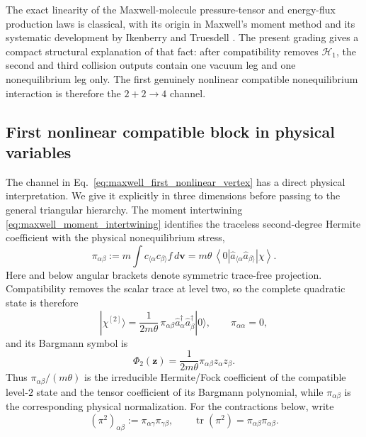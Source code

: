 \documentclass[11pt,oneside]{article}
\numberwithin{equation}{section}
\theoremstyle{definition}
\begin{document}
The exact linearity of the Maxwell-molecule pressure-tensor and energy-flux production laws is classical, with its origin in Maxwell's moment method and its systematic development by Ikenberry and Truesdell \cite{Maxwell1867DynamicalTheory,IkenberryTruesdell1956I,Truesdell1956II,TruesdellMuncaster1980Maxwell}.  The present grading gives a compact structural explanation of that fact: after compatibility removes $\mathscr H_1$, the second and third collision outputs contain one vacuum leg and one nonequilibrium leg only.  The first genuinely nonlinear compatible nonequilibrium interaction is therefore the $2+2\to4$ channel.

\subsection{First nonlinear compatible block in physical variables}
\label{subsec:maxwell_first_nonlinear_physical}

The channel in Eq.~\eqref{eq:maxwell_first_nonlinear_vertex} has a direct physical interpretation.  We give it explicitly in three dimensions before passing to the general triangular hierarchy.  The moment intertwining \eqref{eq:maxwell_moment_intertwining} identifies the traceless second-degree Hermite coefficient with the physical nonequilibrium stress,
\begin{equation}
\pi_{\alpha\beta}
:=m\int c_{\langle\alpha}c_{\beta\rangle}f\,d\bm v
=m\theta\,
\left\langle0\left|\hat a_{\langle\alpha}\hat a_{\beta\rangle}\right|\chi\right\rangle .
\label{eq:maxwell_stress_Fock_pairing}
\end{equation}
Here and below angular brackets denote symmetric trace-free projection.  Compatibility removes the scalar trace at level two, so the complete quadratic state is therefore
\begin{equation}
 |\chi^{[2]}\rangle
 =\frac{1}{2m\theta}\,
 \pi_{\alpha\beta}\hat a_\alpha^\dagger\hat a_\beta^\dagger|0\rangle,
 \qquad
 \pi_{\alpha\alpha}=0,
\label{eq:maxwell_stress_quadratic_state}
\end{equation}
and its Bargmann symbol is
\begin{equation}
 \Phi_2(\bm z)
 =\frac{1}{2m\theta}\pi_{\alpha\beta}z_\alpha z_\beta.
\label{eq:maxwell_stress_Bargmann_symbol}
\end{equation}
Thus $\pi_{\alpha\beta}/(m\theta)$ is the irreducible Hermite/Fock coefficient of the compatible level-$2$ state and the tensor coefficient of its Bargmann polynomial, while $\pi_{\alpha\beta}$ is the corresponding physical normalization.  For the contractions below, write
\begin{equation}
 (\pi^2)_{\alpha\beta}:=\pi_{\alpha\gamma}\pi_{\gamma\beta},
 \qquad
 \operatorname{tr}(\pi^2)=\pi_{\alpha\beta}\pi_{\alpha\beta}.
\label{eq:maxwell_pi_square_def}
\end{equation}
\end{document}
